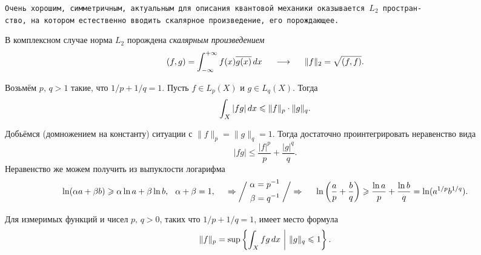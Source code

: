 \texttt{Очень хорошим, симметричным, актуальным для описания квантовой механики оказывается $L_2$ простран-\\ство, на котором естественно вводить скалярное произведение, его порождающее.} 

 \begin{to_def}
     В комплексном случае норма $L_2$ порождена \textit{скалярным произведением}
     \begin{equation*}
         (f, g) = \int_{-\infty}^{+\infty} f(x) \overline{g(x)} \d x
         \hspace{0.5cm} \longrightarrow \hspace{0.5cm}
         \|f\|_2 = \sqrt{(f, f)}.
     \end{equation*}
 \end{to_def}


\begin{to_thr}
    Возьмём $p, \, q > 1$ такие, что $1/p + 1/q = 1$. Пусть $f \in L_p (X)$ и $g \in L_q(X)$. Тогда
    \begin{equation*}
        \int_X |fg| \d x \leq \|f\|_p \cdot \|g\|_q.
    \end{equation*}
\end{to_thr}

\begin{uproof}
    Добьёмся (домножением на константу) ситуации с $\|f\|_p = \|g\|_q=1$. 
    Тогда достаточно проинтегрировать неравенство вида
    \begin{equation*}
        |fg| \leq \frac{|f|^p}{p} + \frac{|g|^q}{q}.
    \end{equation*}
    Неравенство же можем получить из выпуклости логарифма
    \begin{equation*}
        \ln(\alpha a + \beta b) \geq \alpha \ln a + \beta \ln b, \hspace{2.5 mm} \alpha + \beta = 1,
        \hspace{0.5cm} \Rightarrow  \bigg/ \left.\begin{aligned}
            \alpha = p^{-1} \\
            \beta = q^{-1}
        \end{aligned}\right. \bigg/ \Rightarrow\hspace{0.5cm}
        \ln\left(\frac{a}{p} + \frac{b}{q}\right) \geq \frac{\ln a}{p} + \frac{\ln b}{q} = \ln (a^{1/p} b^{1/q}).
    \end{equation*}
\end{uproof}

\begin{to_con}
    Для измеримых функций и чисел $p, \, q > 0$, таких что $1/p + 1/q = 1$, имеет место формула
    \begin{equation}
        \label{8_1}
        \|f\|_p = \sup \left\{
            \int_X fg \d x \ \bigg| \  \|g\|_q \leq 1
        \right\}.
    \end{equation}
\end{to_con}

